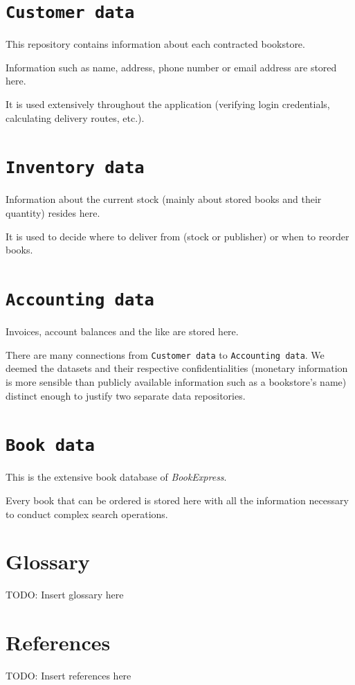 \section{\texttt{Customer data}}
This repository contains information about each contracted bookstore.

Information such as name, address, phone number or email address are stored here.

It is used extensively throughout the application (verifying login credentials, calculating delivery routes, etc.).


\section{\texttt{Inventory data}}
Information about the current stock (mainly about stored books and their quantity) resides here.

It is used to decide where to deliver from (stock or publisher) or when to reorder books.


\section{\texttt{Accounting data}}
Invoices, account balances and the like are stored here.

There are many connections from \texttt{Customer data} to \texttt{Accounting data}. We deemed the datasets and their respective confidentialities (monetary
information is more sensible than publicly available information such as a bookstore's name) distinct enough to justify two separate data repositories.


\section{\texttt{Book data}}
This is the extensive book database of \emph{BookExpress}.

Every book that can be ordered is stored here with all the information necessary to conduct complex search operations.


\newpage
\begin{appendix}
\section{Glossary}
TODO: Insert glossary here
\section{References}
TODO: Insert references here
\end{appendix}



